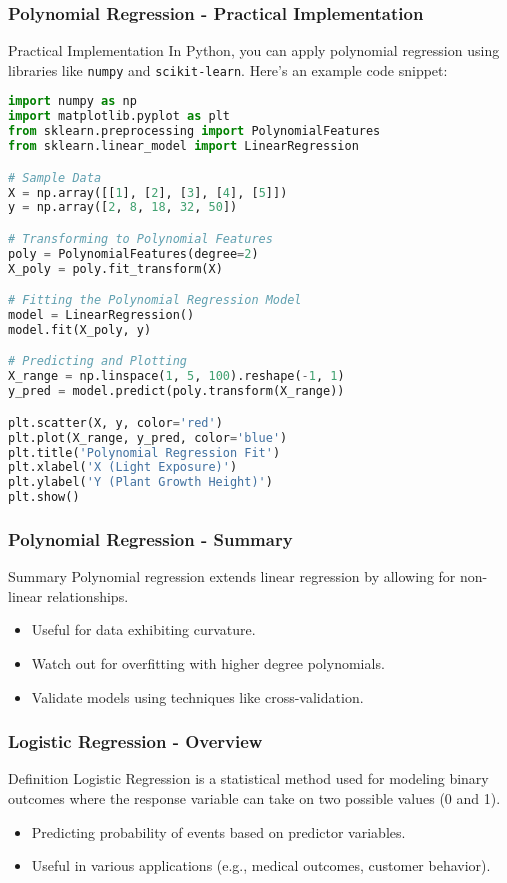 \documentclass{beamer}
\begin{document}
\begin{frame}[fragile]
    \frametitle{Polynomial Regression - Practical Implementation}
    \begin{block}{Practical Implementation}
        In Python, you can apply polynomial regression using libraries like \texttt{numpy} and \texttt{scikit-learn}. Here's an example code snippet:
        \begin{lstlisting}[language=Python]
import numpy as np
import matplotlib.pyplot as plt
from sklearn.preprocessing import PolynomialFeatures
from sklearn.linear_model import LinearRegression

# Sample Data
X = np.array([[1], [2], [3], [4], [5]])
y = np.array([2, 8, 18, 32, 50])

# Transforming to Polynomial Features
poly = PolynomialFeatures(degree=2)
X_poly = poly.fit_transform(X)

# Fitting the Polynomial Regression Model
model = LinearRegression()
model.fit(X_poly, y)

# Predicting and Plotting
X_range = np.linspace(1, 5, 100).reshape(-1, 1)
y_pred = model.predict(poly.transform(X_range))

plt.scatter(X, y, color='red')
plt.plot(X_range, y_pred, color='blue')
plt.title('Polynomial Regression Fit')
plt.xlabel('X (Light Exposure)')
plt.ylabel('Y (Plant Growth Height)')
plt.show()
        \end{lstlisting}
    \end{block}
\end{frame}

\begin{frame}[fragile]
    \frametitle{Polynomial Regression - Summary}
    \begin{block}{Summary}
        Polynomial regression extends linear regression by allowing for non-linear relationships. 
        \begin{itemize}
            \item Useful for data exhibiting curvature.
            \item Watch out for overfitting with higher degree polynomials.
            \item Validate models using techniques like cross-validation.
        \end{itemize}
    \end{block}
\end{frame}

\begin{frame}[fragile]
    \frametitle{Logistic Regression - Overview}
    \begin{block}{Definition}
    Logistic Regression is a statistical method used for modeling binary outcomes where the response variable can take on two possible values (0 and 1). 
    \end{block}
    
    \begin{itemize}
        \item Predicting probability of events based on predictor variables.
        \item Useful in various applications (e.g., medical outcomes, customer behavior).
    \end{itemize}
\end{frame}
\end{document}
